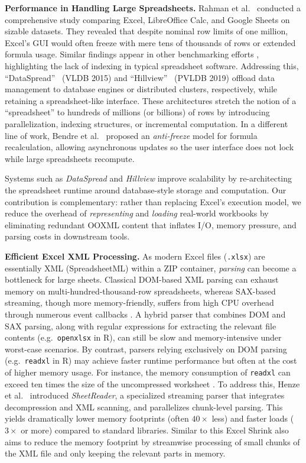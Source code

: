 \documentclass[conference]{IEEEtran}
\begin{document}
\textbf{Performance in Handling Large Spreadsheets.}
Rahman et al.~\cite{Rahman2020Benchmarking} conducted a comprehensive study comparing Excel, LibreOffice Calc, and Google Sheets on sizable datasets. They revealed that despite nominal row limits of one million, Excel’s GUI would often freeze with mere tens of thousands of rows or extended formula usage. Similar findings appear in other bench\-marking efforts 
\cite{Rahman2021NOAH}, 
highlighting the lack of indexing in typical spreadsheet software. Addressing this, “DataSpread”~\cite{Bendre2015DataSpread} (VLDB 2015) and “Hillview”~\cite{Budiu2019Hillview} (PVLDB 2019) offload data management to database engines or distributed clusters, respectively, while retaining a spreadsheet-like interface. These architectures stretch the notion of a “spreadsheet” to hundreds of millions (or billions) of rows by introducing parallelization, indexing structures, or incremental computation. In a different line of work, Bendre et al.~\cite{Bendre2019AntiFreeze} proposed an \emph{anti-freeze} model for formula recalculation, allowing asynchronous updates so the user interface does not lock while large spreadsheets recompute.

Systems such as \textit{DataSpread} and \textit{Hillview} improve scalability by re-architecting the spreadsheet runtime around database-style storage and computation. Our contribution is complementary: rather than replacing Excel’s execution model, we reduce the overhead of \emph{representing} and \emph{loading} real-world workbooks by eliminating redundant OOXML content that inflates I/O, memory pressure, and parsing costs in downstream tools.

\textbf{Efficient Excel XML Processing.}
As modern Excel files (\texttt{.xlsx}) are essentially XML (SpreadsheetML) within a ZIP container, \emph{parsing} can become a bottleneck for large sheets. Classical DOM-based XML parsing can exhaust memory on multi-hundred-thousand-row spreadsheets, whereas SAX-based streaming, though more memory-friendly, suffers from high CPU overhead through numerous event callbacks 
\cite{Henze2022SheetReader}. 
A hybrid parser that combines DOM and SAX parsing, along with regular expressions for extracting the relevant file contents (e.g.\ \texttt{openxlsx} in R), can still be slow and memory-intensive under worst-case scenarios. By contrast, parsers relying exclusively on DOM parsing (e.g.\ \texttt{readxl} in R) may achieve faster runtime performance but often at the cost of higher memory usage. For instance, the memory consumption of \texttt{readxl} can exceed ten times the size of the uncompressed worksheet \cite{Henze2022SheetReader}. 
To address this, Henze et al.~\cite{Henze2022SheetReader} introduced \emph{SheetReader}, a specialized streaming parser that integrates decompression and XML scanning, and parallelizes chunk-level parsing. This yields dramatically lower memory footprints (often $40\times$ less) and faster loads ($3\times$ or more) compared to standard libraries.
Similar to this Excel Shrink also aims to reduce the memory footprint by streamwise processing of small chunks of the XML file and only keeping the relevant parts in memory.
\end{document}
